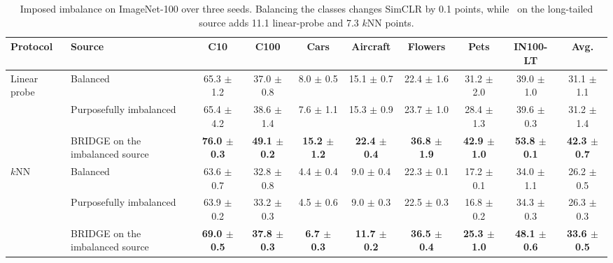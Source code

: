 \begin{table}[t]
\centering
\tiny
\setlength{\tabcolsep}{2.6pt}
\renewcommand{\arraystretch}{0.9}
\caption{Imposed imbalance on ImageNet-100 over three seeds. Balancing the classes changes SimCLR by 0.1 points, while \method\ on the long-tailed source adds 11.1 linear-probe and 7.3 $k$NN points.}
\label{tab:main_controlled_imbalance}
\begin{adjustbox}{max width=\textwidth}
\begin{tabular}{l l c c c c c c c c}
\toprule
Protocol & Source & C10 & C100 & Cars & Aircraft & Flowers & Pets & IN100-LT & Avg. \\
\midrule
Linear probe & Balanced & 65.3 {\scriptsize$\pm$ 1.2} & 37.0 {\scriptsize$\pm$ 0.8} & 8.0 {\scriptsize$\pm$ 0.5} & 15.1 {\scriptsize$\pm$ 0.7} & 22.4 {\scriptsize$\pm$ 1.6} & 31.2 {\scriptsize$\pm$ 2.0} & 39.0 {\scriptsize$\pm$ 1.0} & 31.1 {\scriptsize$\pm$ 1.1} \\
 & Purposefully imbalanced & 65.4 {\scriptsize$\pm$ 4.2} & 38.6 {\scriptsize$\pm$ 1.4} & 7.6 {\scriptsize$\pm$ 1.1} & 15.3 {\scriptsize$\pm$ 0.9} & 23.7 {\scriptsize$\pm$ 1.0} & 28.4 {\scriptsize$\pm$ 1.3} & 39.6 {\scriptsize$\pm$ 0.3} & 31.2 {\scriptsize$\pm$ 1.4} \\
\rowcolor{blue!10} & BRIDGE on the imbalanced source & \textbf{76.0 {\scriptsize$\pm$ 0.3}} & \textbf{49.1 {\scriptsize$\pm$ 0.2}} & \textbf{15.2 {\scriptsize$\pm$ 1.2}} & \textbf{22.4 {\scriptsize$\pm$ 0.4}} & \textbf{36.8 {\scriptsize$\pm$ 1.9}} & \textbf{42.9 {\scriptsize$\pm$ 1.0}} & \textbf{53.8 {\scriptsize$\pm$ 0.1}} & \textbf{42.3 {\scriptsize$\pm$ 0.7}} \\
\midrule
$k$NN & Balanced & 63.6 {\scriptsize$\pm$ 0.7} & 32.8 {\scriptsize$\pm$ 0.8} & 4.4 {\scriptsize$\pm$ 0.4} & 9.0 {\scriptsize$\pm$ 0.4} & 22.3 {\scriptsize$\pm$ 0.1} & 17.2 {\scriptsize$\pm$ 0.1} & 34.0 {\scriptsize$\pm$ 1.1} & 26.2 {\scriptsize$\pm$ 0.5} \\
 & Purposefully imbalanced & 63.9 {\scriptsize$\pm$ 0.2} & 33.2 {\scriptsize$\pm$ 0.3} & 4.5 {\scriptsize$\pm$ 0.6} & 9.0 {\scriptsize$\pm$ 0.3} & 22.5 {\scriptsize$\pm$ 0.3} & 16.8 {\scriptsize$\pm$ 0.2} & 34.3 {\scriptsize$\pm$ 0.3} & 26.3 {\scriptsize$\pm$ 0.3} \\
\rowcolor{blue!10} & BRIDGE on the imbalanced source & \textbf{69.0 {\scriptsize$\pm$ 0.5}} & \textbf{37.8 {\scriptsize$\pm$ 0.3}} & \textbf{6.7 {\scriptsize$\pm$ 0.3}} & \textbf{11.7 {\scriptsize$\pm$ 0.2}} & \textbf{36.5 {\scriptsize$\pm$ 0.4}} & \textbf{25.3 {\scriptsize$\pm$ 1.0}} & \textbf{48.1 {\scriptsize$\pm$ 0.6}} & \textbf{33.6 {\scriptsize$\pm$ 0.5}} \\
\bottomrule
\end{tabular}
\end{adjustbox}
\end{table}
